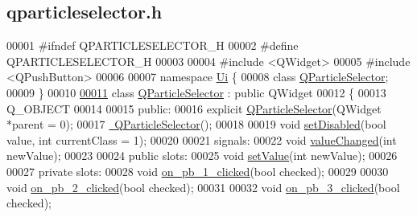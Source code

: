 \hypertarget{qparticleselector_8h_source}{}\subsection{qparticleselector.\+h}
\label{qparticleselector_8h_source}

\begin{DoxyCode}
00001 \textcolor{preprocessor}{#ifndef QPARTICLESELECTOR\_H}
00002 \textcolor{preprocessor}{#define QPARTICLESELECTOR\_H}
00003 
00004 \textcolor{preprocessor}{#include <QWidget>}
00005 \textcolor{preprocessor}{#include <QPushButton>}
00006 
00007 \textcolor{keyword}{namespace }\hyperlink{namespace_ui}{Ui} \{
00008   \textcolor{keyword}{class }\hyperlink{class_q_particle_selector}{QParticleSelector};
00009 \}
00010 
\hypertarget{qparticleselector_8h_source_l00011}{}\hyperlink{class_q_particle_selector}{00011} \textcolor{keyword}{class }\hyperlink{class_q_particle_selector}{QParticleSelector} : \textcolor{keyword}{public} QWidget
00012 \{
00013   Q\_OBJECT
00014 
00015 \textcolor{keyword}{public}:
00016   \textcolor{keyword}{explicit} \hyperlink{class_q_particle_selector_acf2293b16d970f2e61caab8c45ece3c3}{QParticleSelector}(QWidget *parent = 0);
00017   \hyperlink{class_q_particle_selector_ae7f05ca170c3dce228229b6ccdb869ed}{~QParticleSelector}();
00018 
00019   \textcolor{keywordtype}{void} \hyperlink{class_q_particle_selector_ab9401ea22f778fa8ed02577da7888897}{setDisabled}(\textcolor{keywordtype}{bool} value, \textcolor{keywordtype}{int} currentClass = 1);
00020 
00021 signals:
00022   \textcolor{keywordtype}{void} \hyperlink{class_q_particle_selector_ac9562cf3ebd13e54ff69ac6cd5e53c6d}{valueChanged}(\textcolor{keywordtype}{int} newValue);
00023 
00024 \textcolor{keyword}{public} slots:
00025   \textcolor{keywordtype}{void} \hyperlink{class_q_particle_selector_a023ce0a57b716e2d1613a90bd4f81c5d}{setValue}(\textcolor{keywordtype}{int} newValue);
00026 
00027 \textcolor{keyword}{private} slots:
00028   \textcolor{keywordtype}{void} \hyperlink{class_q_particle_selector_aba68bd4d35a15b2ed3f701f0fa4f2bfd}{on\_pb\_1\_clicked}(\textcolor{keywordtype}{bool} checked);
00029 
00030   \textcolor{keywordtype}{void} \hyperlink{class_q_particle_selector_a1fbc0e7f1df72ee334d9877a98966285}{on\_pb\_2\_clicked}(\textcolor{keywordtype}{bool} checked);
00031 
00032   \textcolor{keywordtype}{void} \hyperlink{class_q_particle_selector_a91a4d1eb835be6e238220188653fda2f}{on\_pb\_3\_clicked}(\textcolor{keywordtype}{bool} checked);

\end{DoxyCode}
